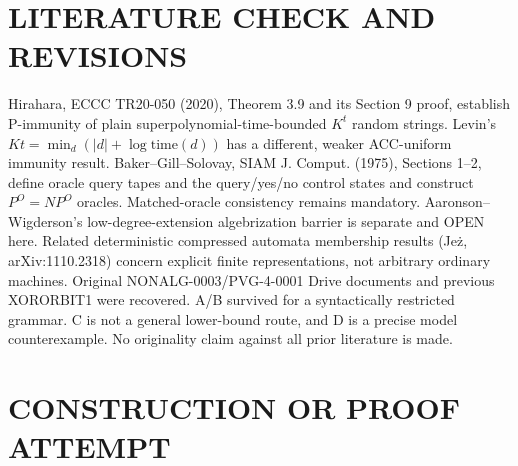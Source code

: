 \documentclass[11pt]{article}
\begin{document}
\section{LITERATURE CHECK AND REVISIONS}
Hirahara, ECCC TR20-050 (2020), Theorem 3.9 and its Section 9 proof, establish P-immunity of plain superpolynomial-time-bounded $K^t$ random strings. Levin's $Kt=\min_d(|d|+\log\mathrm{time}(d))$ has a different, weaker ACC-uniform immunity result. Baker--Gill--Solovay, SIAM J. Comput. (1975), Sections 1--2, define oracle query tapes and the query/yes/no control states and construct $P^O=NP^O$ oracles. Matched-oracle consistency remains mandatory. Aaronson--Wigderson's low-degree-extension algebrization barrier is separate and OPEN here. Related deterministic compressed automata membership results (Je\.z, arXiv:1110.2318) concern explicit finite representations, not arbitrary ordinary machines. Original NONALG-0003/PVG-4-0001 Drive documents and previous XORORBIT1 were recovered. A/B survived for a syntactically restricted grammar. C is not a general lower-bound route, and D is a precise model counterexample. No originality claim against all prior literature is made.

\section{CONSTRUCTION OR PROOF ATTEMPT}
\end{document}
